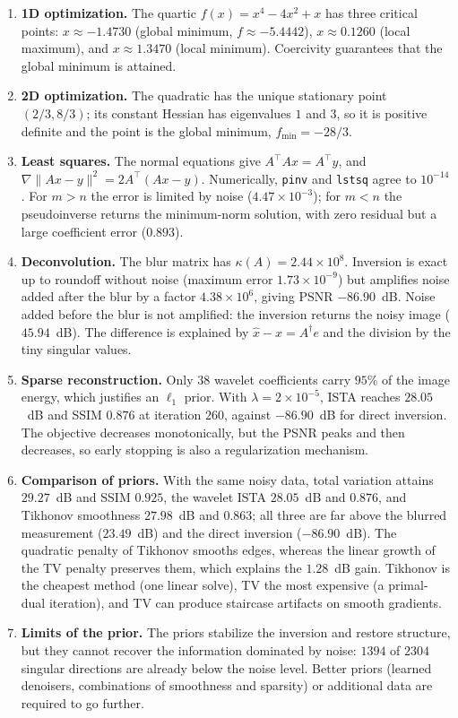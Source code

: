 \documentclass[11pt,a4paper]{article}
\newcommand{\T}{\top}
\begin{document}
\begin{enumerate}[leftmargin=1.6em,itemsep=2pt]
\item \textbf{1D optimization.} The quartic $f(x)=x^4-4x^2+x$ has three critical points:
$x\approx-1.4730$ (global minimum, $f\approx-5.4442$), $x\approx0.1260$ (local maximum), and
$x\approx1.3470$ (local minimum). Coercivity guarantees that the global minimum is attained.
\item \textbf{2D optimization.} The quadratic has the unique stationary point $(2/3,8/3)$; its
constant Hessian has eigenvalues $1$ and $3$, so it is positive definite and the point is the
global minimum, $f_{\min}=-28/3$.
\item \textbf{Least squares.} The normal equations give $A^\T A x=A^\T y$, and
$\nabla\|Ax-y\|^2=2A^\T(Ax-y)$. Numerically, \texttt{pinv} and \texttt{lstsq} agree to
$10^{-14}$. For $m>n$ the error is limited by noise ($4.47\times10^{-3}$); for $m<n$ the
pseudoinverse returns the minimum-norm solution, with zero residual but a large coefficient error
($0.893$).
\item \textbf{Deconvolution.} The blur matrix has $\kappa(A)=2.44\times10^{8}$. Inversion is exact
up to roundoff without noise (maximum error $1.73\times10^{-9}$) but amplifies noise added after
the blur by a factor $4.38\times10^{6}$, giving PSNR $-86.90$~dB. Noise added before the blur is not amplified:
the inversion returns the noisy image ($45.94$~dB). The difference is explained by
$\hat{x}-x=A^\dagger e$ and the division by the tiny singular values.
\item \textbf{Sparse reconstruction.} Only $38$ wavelet coefficients carry $95\%$ of the image
energy, which justifies an $\ell_1$ prior. With $\lambda=2\times10^{-5}$, ISTA reaches
$28.05$~dB and SSIM $0.876$ at iteration $260$, against $-86.90$~dB for direct inversion. The
objective decreases monotonically, but the PSNR peaks and then decreases, so early stopping is
also a regularization mechanism.
\item \textbf{Comparison of priors.} With the same noisy data, total variation attains
$29.27$~dB and SSIM $0.925$, the wavelet ISTA $28.05$~dB and $0.876$, and Tikhonov smoothness
$27.98$~dB and $0.863$; all three are far above the blurred measurement ($23.49$~dB) and the
direct inversion ($-86.90$~dB). The quadratic penalty of Tikhonov smooths edges, whereas the
linear growth of the TV penalty preserves them, which explains the $1.28$~dB gain. Tikhonov is
the cheapest method (one linear solve), TV the most expensive (a primal-dual iteration), and TV
can produce staircase artifacts on smooth gradients.
\item \textbf{Limits of the prior.} The priors stabilize the inversion and restore structure, but
they cannot recover the information dominated by noise: $1394$ of $2304$ singular directions are
already below the noise level. Better priors (learned denoisers, combinations of smoothness and
sparsity) or additional data are required to go further.
\end{enumerate}
\end{document}
